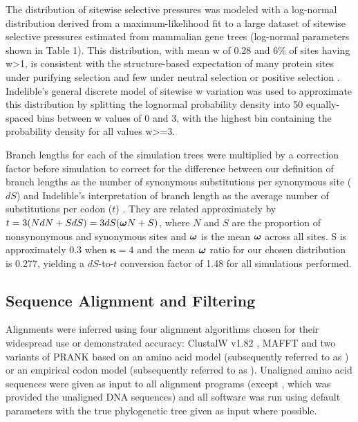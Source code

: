 \documentclass{mbe}
\begin{document}
The distribution of sitewise selective pressures was modeled with a
log-normal distribution derived from a maximum-likelihood fit to a
large dataset of sitewise selective pressures estimated from mammalian
gene trees (log-normal parameters shown in Table 1). This
distribution, with mean w of 0.28 and 6\% of sites having w>1, is
consistent with the structure-based expectation of many protein sites
under purifying selection and few under neutral selection or positive
selection
\citep{Smith1970Natural,Kimura1974SomePrinciples}. Indelible's general
discrete model of sitewise w variation was used to approximate this
distribution by splitting the lognormal probability density into 50
equally-spaced bins between w values of 0 and 3, with the highest bin
containing the probability density for all values w>=3.

Branch lengths for each of the simulation trees were multiplied by a
correction factor before simulation to correct for the difference
between our definition of branch lengths as the number of synonymous
substitutions per synonymous site ($dS$) and Indelible's
interpretation of branch length as the average number of substitutions
per codon ($t$) \citep{Fletcher2010Effect}. They are related
approximately by $t = 3(NdN + SdS) = 3dS(\bm{\omega}{}N + S)$, where $N$ and
$S$ are the proportion of nonsynonymous and synonymous sites and
$\bm{\omega}{}$ is the mean $\bm{\omega}{}$ across all sites. S is approximately 0.3
when $\bm{\kappa}=4$ and the mean $\bm{\omega}{}$ ratio for our chosen
distribution is 0.277, yielding a $dS$-to-$t$ conversion factor of
1.48 for all simulations performed.

\subsection*{Sequence Alignment and Filtering}

Alignments were inferred using four alignment algorithms chosen for
their widespread use or demonstrated accuracy: ClustalW v1.82
\citep{Thompson1994ClustalW}, MAFFT \citep{Katoh2005MAFFT} and two
variants of PRANK \citep{Loytynoja2005From} based on an amino acid
model (subsequently referred to as \pranka{}) or an empirical codon
model (subsequently referred to as \prankc{}). Unaligned amino acid
sequences were given as input to all alignment programs (except
\prankc{}, which was provided the unaligned DNA sequences) and all
software was run using default parameters with the true phylogenetic
tree given as input where possible.
\end{document}
